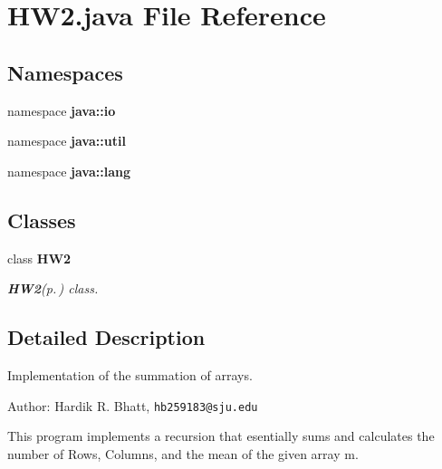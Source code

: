 \section{HW2.java File Reference}
\label{_h_w2_8java}
\subsection*{Namespaces}
\begin{CompactItemize}
\item 
namespace {\bf java::io}
\item 
namespace {\bf java::util}
\item 
namespace {\bf java::lang}
\end{CompactItemize}
\subsection*{Classes}
\begin{CompactItemize}
\item 
class {\bf HW2}
\begin{CompactList}\small\item\em {\bf HW2}{\rm (p.\,\pageref{class_h_w2})} class. \item\end{CompactList}\end{CompactItemize}


\subsection{Detailed Description}
Implementation of the summation of arrays. \begin{Desc}
\item[Author:]Hardik R. Bhatt, {\tt hb259183@sju.edu}\end{Desc}
This program implements a recursion that esentially sums and calculates the number of Rows, Columns, and the mean of the given array m. 